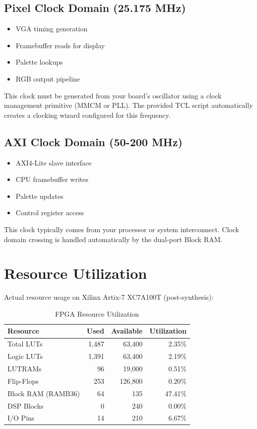 \documentclass[11pt,letterpaper]{report}
\begin{document}
\subsection{Pixel Clock Domain (25.175 MHz)}

\begin{itemize}
    \item VGA timing generation
    \item Framebuffer reads for display
    \item Palette lookups
    \item RGB output pipeline
\end{itemize}

This clock must be generated from your board's oscillator using a clock management primitive (MMCM or PLL). The provided TCL script automatically creates a clocking wizard configured for this frequency.

\subsection{AXI Clock Domain (50-200 MHz)}

\begin{itemize}
    \item AXI4-Lite slave interface
    \item CPU framebuffer writes
    \item Palette updates
    \item Control register access
\end{itemize}

This clock typically comes from your processor or system interconnect. Clock domain crossing is handled automatically by the dual-port Block RAM.

\section{Resource Utilization}

Actual resource usage on Xilinx Artix-7 XC7A100T (post-synthesis):

\begin{table}[tbp]
\centering
\caption{FPGA Resource Utilization}
\label{tab:resources}
\begin{tabular}{lrrr}
\toprule
\textbf{Resource} & \textbf{Used} & \textbf{Available} & \textbf{Utilization} \\
\midrule
Total LUTs         & 1,487 & 63,400  & 2.35\% \\
\quad Logic LUTs  & 1,391 & 63,400  & 2.19\% \\
\quad LUTRAMs     &    96 & 19,000  & 0.51\% \\
Flip-Flops         &   253 & 126,800 & 0.20\% \\
Block RAM (RAMB36) &    64 &     135 & 47.41\% \\
DSP Blocks         &     0 &     240 & 0.00\% \\
I/O Pins           &    14 &     210 & 6.67\% \\
\bottomrule
\end{tabular}
\end{table}
\end{document}
